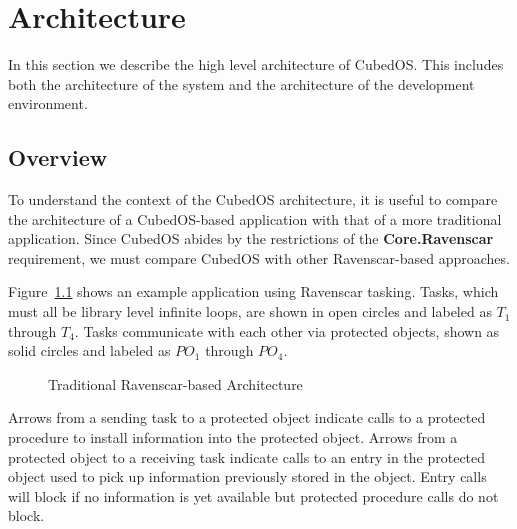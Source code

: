 
\chapter{Architecture}
\label{chapt:architecture}

In this section we describe the high level architecture of CubedOS. This includes both the
architecture of the system and the architecture of the development environment.

\section{Overview}
\label{sec:overview}

To understand the context of the CubedOS architecture, it is useful to compare the architecture
of a CubedOS-based application with that of a more traditional application. Since CubedOS abides
by the restrictions of the \textbf{Core.Ravenscar} requirement, we must compare CubedOS with
other Ravenscar-based approaches.

Figure~\ref{fig:traditional-architecture} shows an example application using Ravenscar tasking.
Tasks, which must all be library level infinite loops, are shown in open circles and labeled as
$T_1$ through $T_4$. Tasks communicate with each other via protected objects, shown as solid
circles and labeled as $PO_1$ through $PO_4$.

\begin{figure}[tbhp]
  \center
  \caption{Traditional Ravenscar-based Architecture}
  \label{fig:traditional-architecture}
\end{figure}

Arrows from a sending task to a protected object indicate calls to a protected procedure to
install information into the protected object. Arrows from a protected object to a receiving
task indicate calls to an entry in the protected object used to pick up information previously
stored in the object. Entry calls will block if no information is yet available but protected
procedure calls do not block.

